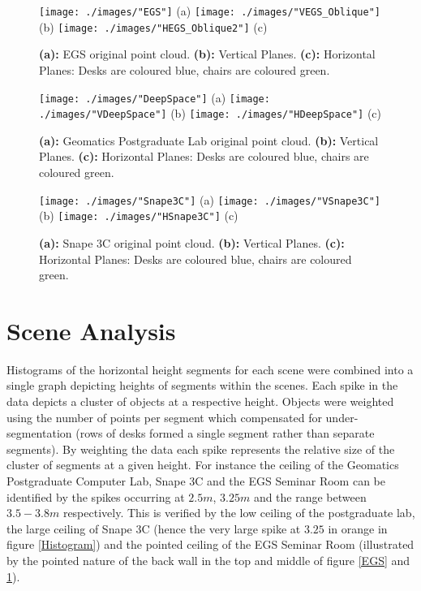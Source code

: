 \begin{figure}[h!]
	\centering
	\texttt{[image: ./images/"EGS"]}
	(a)
	\texttt{[image: ./images/"VEGS\_Oblique"]}
	(b)
	\texttt{[image: ./images/"HEGS\_Oblique2"]}
	(c)
	\caption[Results of the plane segmentation for the EGS Seminar Room]{\textbf{(a):} EGS original point cloud. \textbf{(b):} Vertical Planes. \textbf{(c):} Horizontal Planes: Desks are coloured blue, chairs are coloured green.\label{FinalEGS}}
\end{figure}
\clearpage
\begin{figure}[h!]
	\centering
	\texttt{[image: ./images/"DeepSpace"]}
	(a)
	\texttt{[image: ./images/"VDeepSpace"]}
	(b)
	\texttt{[image: ./images/"HDeepSpace"]}
	(c)
	\caption[Results of the plane segmentation for the Geomatics Postgrad Lab]{\textbf{(a):} Geomatics Postgraduate Lab original point cloud. \textbf{(b):} Vertical Planes. \textbf{(c):} Horizontal Planes: Desks are coloured blue, chairs are coloured green.\label{FinalDeepSpace}}
\end{figure}
\clearpage
\begin{figure}[h!]
	\centering
	\texttt{[image: ./images/"Snape3C"]}
	(a)
	\texttt{[image: ./images/"VSnape3C"]}
	(b)
	\texttt{[image: ./images/"HSnape3C"]}
	(c)
	\caption[Results of the plane segmentation for Snape 3C]{\textbf{(a):} Snape 3C original point cloud. \textbf{(b):} Vertical Planes. \textbf{(c):} Horizontal Planes: Desks are coloured blue, chairs are coloured green.\label{FinalSnape}}
\end{figure}
\clearpage
\section{Scene Analysis \label{sceneAnalysis}}
Histograms of the horizontal height segments for each scene were combined into a single graph depicting heights of segments within the scenes. Each spike in the data depicts a cluster of objects at a respective height. Objects were weighted using the number of points per segment which compensated for under-segmentation (rows of desks formed a single segment rather than separate segments). By weighting the data each spike represents the relative size of the cluster of segments at a given height. For instance the ceiling of the Geomatics Postgraduate Computer Lab, Snape 3C and the EGS Seminar Room can be identified by the spikes occurring at $2.5m$, $3.25m$ and the range between $3.5-3.8m$ respectively. This is verified by the low ceiling of the postgraduate lab, the large ceiling  of Snape 3C (hence the very large spike at $3.25$ in orange in figure \ref{Histogram}) and the pointed ceiling of the EGS Seminar Room (illustrated by the pointed nature of the back wall in the top and middle of figure \ref{EGS} and \ref{FinalEGS}).

